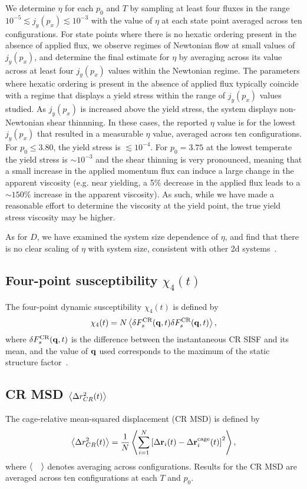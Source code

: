 \documentclass[amsmath,amssymb,prl,reprint,twocolumn]{revtex4-2}
\begin{document}
We determine $\eta$ for each $p_0$ and $T$ by sampling at least four fluxes in the range $10^{-5}\lesssim j_y(p_x) \lesssim 10^{-3}$ with the value of $\eta$ at each state point averaged across ten configurations.
For state points where there is no hexatic ordering present in the absence of applied flux, we observe regimes of Newtonian flow at small values of $j_y(p_x)$, and determine the final estimate for $\eta$ by averaging across its value across at least four $j_y(p_x)$ values within the Newtonian regime.
The parameters where hexatic ordering is present in the absence of applied flux typically coincide with a regime that displays a yield stress within the range of $j_y(p_x)$ values studied.
As $j_y(p_x)$ is increased above the yield stress, the system displays non-Newtonian shear thinnning.
In these cases, the reported $\eta$ value is for the lowest $j_y(p_x)$ that resulted in a measurable $\eta$ value, averaged across ten configurations.
For $p_0\leq 3.80$, the yield stress is $\lesssim10^{-4}$.
For $p_0=3.75$ at the lowest temperate the yield stress is $\sim 10^{-3}$ and the shear thinning is very pronounced, meaning that a small increase in the applied momentum flux can induce a large change in the apparent viscosity (e.g. near yielding, a 5\% decrease in the applied flux leads to a $\sim 150\%$ increase in the apparent viscosity).
As such, while we have made a reasonable effort to determine the viscosity at the yield point, the true yield stress viscosity may be higher.

As for $D$, we have examined the system size dependence of $\eta$, and find that there is no clear scaling of $\eta$ with system size, consistent with other 2d systems~\cite{Choi2017,Shiba2019}.



\subsection{Four-point susceptibility $\chi_4(t)$}
The four-point dynamic susceptibility $\chi_4(t)$ is defined by
\begin{equation}
\chi_4(t) = N \expval{\delta F_s^{\text{CR}}(\vb{q},t)\delta F_s^{\text{CR}}(\vb{q},t)},
\end{equation}
where $\delta F_s^{\text{CR}}(\vb{q},t)$ is the difference between the instantaneous CR SISF and its mean, and the value of $\vb{q}$ used corresponds to the maximum of the static structure factor~\cite{Szamel2006}.

\subsection{CR MSD $\expval{\Delta r^2_{CR} (t)}$}
The cage-relative mean-squared displacement (CR MSD) is defined by~\cite{Mazoyer2009}
\begin{equation}
   \expval{\Delta r^2_{CR} (t)} = \frac{1}{N}\expval{\sum_{i=1}^N\left[\Delta\vb{r}_i(t)-\Delta\vb{r}_i^{\text{cage}}(t)\right]^2},
\end{equation}
where $\expval{\quad}$ denotes averaging across configurations.
Results for the CR MSD are averaged across ten configurations at each $T$ and $p_0$.
\end{document}
